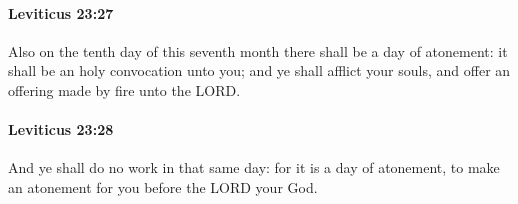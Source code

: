 		\paragraph{Leviticus 23:27} %
			\label{LEVITICUS-23-27}

			Also on the tenth day of this seventh month there shall be a day of atonement: it shall be an holy convocation unto you; and ye shall afflict your souls, and offer an offering made by fire unto the LORD.


		\paragraph{Leviticus 23:28} %
			\label{LEVITICUS-23-28}

			And ye shall do no work in that same day: for it is a day of atonement, to make an atonement for you before the LORD your God.


